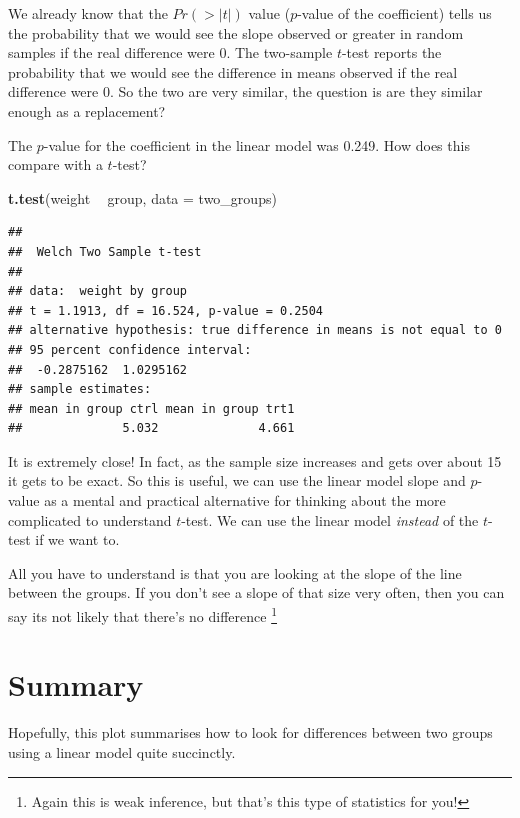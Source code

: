 \documentclass[
]{book}
\newenvironment{Shaded}{\begin{snugshade}}{\end{snugshade}}
\newcommand{\DataTypeTok}[1]{\textcolor[rgb]{0.13,0.29,0.53}{#1}}
\newcommand{\KeywordTok}[1]{\textcolor[rgb]{0.13,0.29,0.53}{\textbf{#1}}}
\newcommand{\NormalTok}[1]{#1}
\newcommand{\OperatorTok}[1]{\textcolor[rgb]{0.81,0.36,0.00}{\textbf{#1}}}
\newcommand{\StringTok}[1]{\textcolor[rgb]{0.31,0.60,0.02}{#1}}
\begin{document}
We already know that the \(Pr(>|t|)\) value (\(p\)-value of the coefficient) tells us the probability that we would see the slope observed or greater in random samples if the real difference were 0. The two-sample \(t\)-test reports the probability that we would see the difference in means observed if the real difference were 0. So the two are very similar, the question is are they similar enough as a replacement?

The \(p\)-value for the coefficient in the linear model was 0.249. How does this compare with a \(t\)-test?

\begin{Shaded}
\begin{Highlighting}[]
\KeywordTok{t.test}\NormalTok{(weight }\OperatorTok{~}\StringTok{ }\NormalTok{group, }\DataTypeTok{data =}\NormalTok{ two_groups)}
\end{Highlighting}
\end{Shaded}

\begin{verbatim}
## 
## 	Welch Two Sample t-test
## 
## data:  weight by group
## t = 1.1913, df = 16.524, p-value = 0.2504
## alternative hypothesis: true difference in means is not equal to 0
## 95 percent confidence interval:
##  -0.2875162  1.0295162
## sample estimates:
## mean in group ctrl mean in group trt1 
##              5.032              4.661
\end{verbatim}

It is extremely close! In fact, as the sample size increases and gets over about 15 it gets to be exact. So this is useful, we can use the linear model slope and \(p\)-value as a mental and practical alternative for thinking about the more complicated to understand \(t\)-test. We can use the linear model \emph{instead} of the \(t\)-test if we want to.

All you have to understand is that you are looking at the slope of the line between the groups. If you don't see a slope of that size very often, then you can say its not likely that there's no difference \footnote{Again this is weak inference, but that's this type of statistics for you!}

\hypertarget{summary}{%
\section{Summary}\label{summary}}

Hopefully, this plot summarises how to look for differences between two groups using a linear model quite succinctly.
\end{document}
